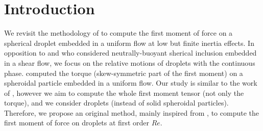 \section{Introduction}


We revisit the methodology of \citet{stone2001inertial,raja2010inertial,dabade2015}  to compute the first moment of force on a spherical droplet embedded in a uniform flow at low but finite inertia effects. 
In opposition to \citet{stone2001inertial} and \citet{raja2010inertial} who considered neutrally-buoyant sherical inclusion embedded in a shear flow, we focus on the relative motions of droplets with the continuous phase. 
\citet{dabade2015} computed the torque (skew-symmetric part of the first moment) on a spheroidal particle embedded in a uniform flow. 
Our study is similar to the work of \citet{dabade2015}, however we aim to compute the whole first moment tensor (not only the torque), and we consider droplets (instead of solid spheroidal particles). 
Therefore, we propose an original method, mainly inspired from \citet{stone2001inertial}, to compute the first moment of force on droplets at first order $Re$.  



